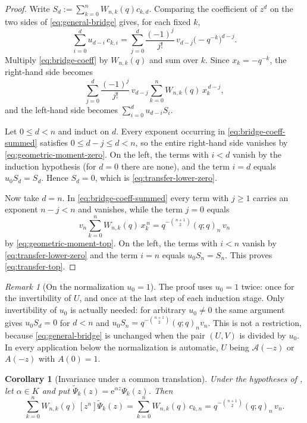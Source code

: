 \documentclass[11pt,oneside,openany]{book}
\newtheorem{corollary}[corollary]{Corollary}
\theoremstyle{definition}
\theoremstyle{remark}
\newtheorem{remark}[remark]{Remark}
\newcommand{\e}{\mathrm e}
\newcommand{\defeq}{\mathrel{:=}}
\begin{document}
\begin{proof}
Write $S_d\defeq\sum_{k=0}^{n}W_{n,k}(q)c_{k,d}$.  Comparing the coefficient of $z^d$ on the two sides of \eqref{eq:general-bridge} gives, for each fixed $k$,
\begin{equation}\label{eq:bridge-coeff}
 \sum_{i=0}^{d}u_{d-i}\,c_{k,i}
 =\sum_{j=0}^{d}\frac{(-1)^j}{j!}\,v_{d-j}\bigl(-q^{-k}\bigr)^{d-j}.
\end{equation}
Multiply \eqref{eq:bridge-coeff} by $W_{n,k}(q)$ and sum over $k$.  Since $x_k=-q^{-k}$, the right-hand side becomes
\begin{equation}\label{eq:bridge-coeff-summed}
 \sum_{j=0}^{d}\frac{(-1)^j}{j!}\,v_{d-j}
 \sum_{k=0}^{n}W_{n,k}(q)\,x_k^{\,d-j},
\end{equation}
and the left-hand side becomes $\sum_{i=0}^{d}u_{d-i}S_i$.

Let $0\le d<n$ and induct on $d$.  Every exponent occurring in \eqref{eq:bridge-coeff-summed} satisfies $0\le d-j\le d<n$, so the entire right-hand side vanishes by \eqref{eq:geometric-moment-zero}.  On the left, the terms with $i<d$ vanish by the induction hypothesis (for $d=0$ there are none), and the term $i=d$ equals $u_0S_d=S_d$.  Hence $S_d=0$, which is \eqref{eq:transfer-lower-zero}.

Now take $d=n$.  In \eqref{eq:bridge-coeff-summed} every term with $j\ge1$ carries an exponent $n-j<n$ and vanishes, while the term $j=0$ equals
\[
 v_n\sum_{k=0}^{n}W_{n,k}(q)\,x_k^{\,n}
 =q^{-\binom{n+1}{2}}(q;q)_n\,v_n
\]
by \eqref{eq:geometric-moment-top}.  On the left, the terms with $i<n$ vanish by \eqref{eq:transfer-lower-zero} and the term $i=n$ equals $u_0S_n=S_n$.  This proves \eqref{eq:transfer-top}.
\end{proof}

\begin{remark}[On the normalization $u_0=1$]\label{rem:transfer-normalization}
The proof uses $u_0=1$ twice: once for the invertibility of $U$, and once at the last step of each induction stage.  Only invertibility of $u_0$ is actually needed: for arbitrary $u_0\ne0$ the same argument gives $u_0S_d=0$ for $d<n$ and $u_0S_n=q^{-\binom{n+1}{2}}(q;q)_nv_n$.  This is not a restriction, because \eqref{eq:general-bridge} is unchanged when the pair $(U,V)$ is divided by $u_0$.  In every application below the normalization is automatic, $U$ being $\mathcal A(-z)$ or $A(-z)$ with $A(0)=1$.
\end{remark}

\begin{corollary}[Invariance under a common translation]\label{cor:transfer-translation}
Under the hypotheses of , let $\alpha\in K$ and put $\widetilde\Psi_k(z)=\e^{\alpha z}\Psi_k(z)$.  Then
\begin{equation}\label{eq:transfer-translation-invariance}
 \sum_{k=0}^{n}W_{n,k}(q)\,[z^n]\widetilde\Psi_k(z)
 =\sum_{k=0}^{n}W_{n,k}(q)\,c_{k,n}
 =q^{-\binom{n+1}{2}}(q;q)_n\,v_n .
\end{equation}
\end{corollary}
\end{document}
